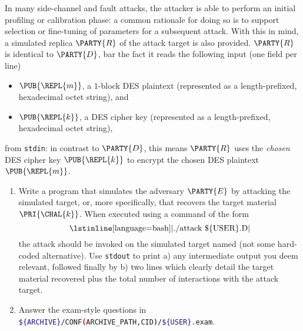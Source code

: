 
In many side-channel and fault attacks, the attacker is able to perform an 
initial profiling or calibration phase: a common rationale for doing so is 
to support selection or fine-tuning of parameters for a subsequent attack.  
With this in mind, a simulated replica $\PARTY{R}$ of the attack target is 
also provided.
$\PARTY{R}$ is identical to $\PARTY{D}$, bar the fact it
 reads the following  input (one field per line)

\begin{itemize}
\item $\PUB{\REPL{m}}$, 
      a  $1$-block DES plaintext
      (represented as a  length-prefixed, hexadecimal octet   string), 
      and
\item $\PUB{\REPL{k}}$, 
      a           DES cipher key
      (represented as a  length-prefixed, hexadecimal octet   string), 
\end{itemize}

\noindent
from \lstinline[language={bash}]{stdin}:
in contrast to $\PARTY{D}$, this means $\PARTY{R}$ uses the
{\em chosen} DES cipher key $\PUB{\REPL{k}}$
to encrypt the
     chosen  DES  plaintext $\PUB{\REPL{m}}$.



\begin{enumerate}
\item Write a program that simulates the adversary $\PARTY{E}$ by attacking
      the simulated target, or, more specifically, that recovers the target 
      material $\PRI{\CHAL{k}}$.  
      When executed using a command of the form
      \[
      \mbox{\lstinline[language={bash}]|./attack \$\{USER\}.D|}
      \]
      the attack should be invoked on the simulated target named (not some
      hard-coded alternative).  Use \lstinline[language={bash}]{stdout} to 
      print 
      a) any intermediate output you deem relevant, followed finally by 
      b) two lines which clearly detail the target material recovered plus
         the total number of interactions with the attack target.
\item Answer the exam-style questions in 
      \lstinline[language={bash}]|${ARCHIVE}/CONF(ARCHIVE_PATH,CID)/${USER}.exam|.
\end{enumerate}

